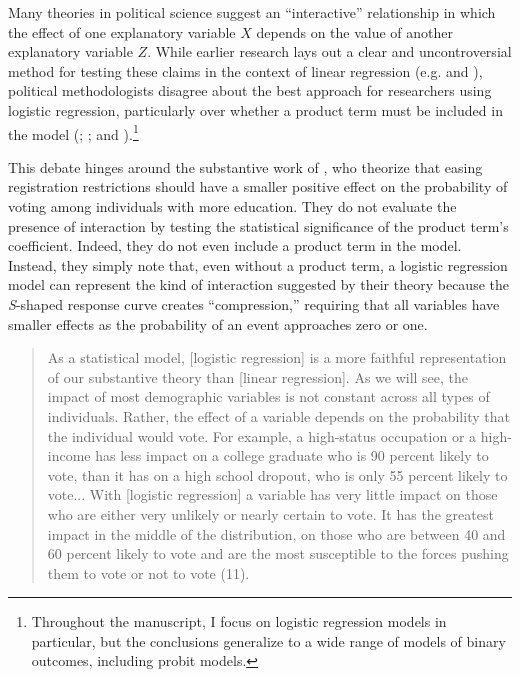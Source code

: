 \documentclass[12pt]{article}
\begin{document}
Many theories in political science suggest an ``interactive'' relationship in which the effect of one explanatory variable $X$ depends on the value of another explanatory variable $Z$. While earlier research lays out a clear and uncontroversial method for testing these claims in the context of linear regression (e.g. \citealt{KamFranzese2007} and \citealt{BramborClarkGolder2006}), political methodologists disagree about the best approach for researchers using logistic regression, particularly over whether a product term must be included in the model (\citealt{Nagler1991}; \citealt{BramborClarkGolder2006}; and \citealt{BerryDeMerittEsarey2010}).\footnote{Throughout the manuscript, I focus on logistic regression models in particular, but the conclusions generalize to a wide range of models of binary outcomes, including probit models.}  


This debate hinges around the substantive work of \cite{WolfingerRosenstone1980}, who theorize that easing registration restrictions should have a smaller positive effect on the probability of voting among individuals with more education. They do not evaluate the presence of interaction by testing the statistical significance of the product term's coefficient. Indeed, they do not even include a product term in the model. Instead, they simply note that, even without a product term, a logistic regression model can represent the kind of interaction suggested by their theory because the \textit{S}-shaped response curve creates ``compression,'' requiring that all variables have smaller effects as the probability of an event approaches zero or one. 

\begin{quote}\singlespace
As a statistical model, [logistic regression] is a more faithful representation of our substantive theory than [linear regression]. As we will see, the impact of most demographic variables is not constant across all types of individuals. Rather, the effect of a variable depends on the probability that the individual would vote. For example, a high-status occupation or a high-income has less impact on a college graduate who is 90 percent likely to vote, than it has on a high school dropout, who is only 55 percent likely to vote... With [logistic regression] a variable has very little impact on those who are either very unlikely or nearly certain to vote. It has the greatest impact in the middle of the distribution, on those who are between 40 and 60 percent likely to vote and are the most susceptible to the forces pushing them to vote or not to vote (11).
\end{quote}
\end{document}
